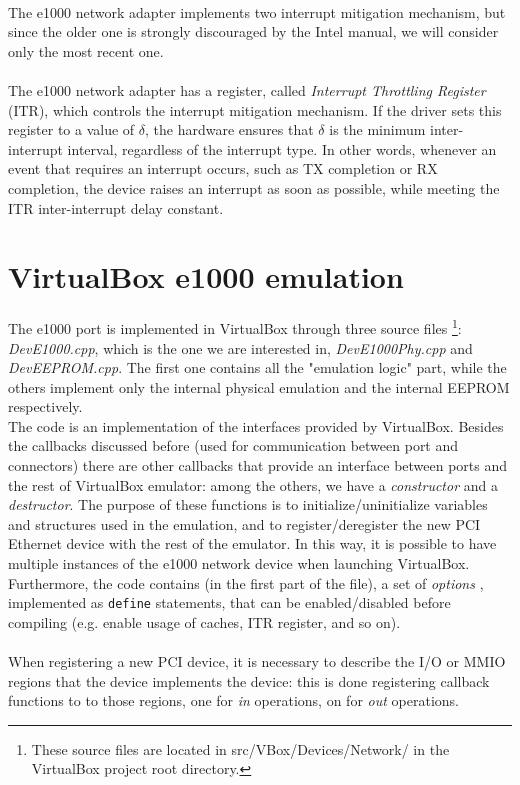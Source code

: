 \documentclass[a4paper, 12pt, titlepage]{report}
\begin{document}
\\
The e1000 network adapter implements two interrupt mitigation mechanism, but since the older one is strongly discouraged by the Intel manual, we will consider only the most recent one.
\\
\\
The e1000 network adapter has a register, called \textit{Interrupt Throttling Register} (ITR), which controls the interrupt mitigation mechanism. If the driver sets this register to a value of $\delta$, the hardware ensures that $\delta$ is the minimum inter-interrupt interval, regardless of the interrupt type. In other words, whenever an event that requires an interrupt occurs, such as TX completion or RX completion, the device raises an interrupt as soon as possible, while meeting the ITR inter-interrupt delay constant.
\section{VirtualBox e1000 emulation}  \label{sec:e1000_emu}
The e1000 port is implemented in VirtualBox through three source files \footnote{These source files are located in src/VBox/Devices/Network/ in the VirtualBox project root directory.}: \textit{DevE1000.cpp}, which is the one we are interested in, \textit{DevE1000Phy.cpp} and \textit{DevEEPROM.cpp}. The first one contains all the "emulation logic" part, while the others implement only the internal physical emulation and the internal EEPROM respectively.
\\
The code is an implementation of the interfaces provided by VirtualBox. Besides the callbacks discussed before (used for communication between port and connectors) there are other callbacks that provide an interface between ports and the rest of VirtualBox emulator: among the others, we have a  \textit{constructor} and a \textit{destructor}. The purpose of these functions is to initialize/uninitialize variables and structures used in the emulation, and to register/deregister the new PCI Ethernet device with the rest of the emulator. In this way, it is possible to have multiple instances of the e1000 network device when launching VirtualBox.
\\
Furthermore, the code contains (in the first part of the file), a set of \textit{options} , implemented as \texttt{define} statements, that can be enabled/disabled before compiling (e.g. enable usage of caches, ITR register, and so on).
\\
\\
When registering a new PCI device, it is necessary to describe the I/O or MMIO regions that the device implements the device: this is done registering callback functions to to those regions, one for \textit{in} operations, on for \textit{out} operations.
\end{document}
